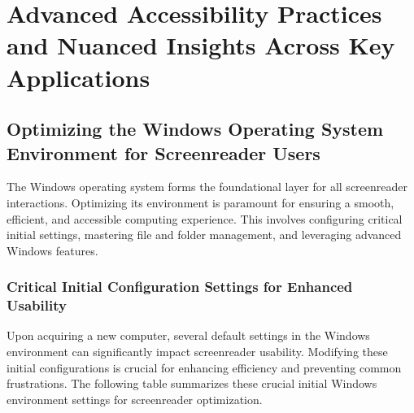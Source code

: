\section{Advanced Accessibility Practices and Nuanced Insights Across Key Applications}

\subsection{Optimizing the Windows Operating System Environment for Screenreader Users}
The Windows operating system forms the foundational layer for all screenreader interactions. Optimizing its environment is paramount for ensuring a smooth, efficient, and accessible computing experience. This involves configuring critical initial settings, mastering file and folder management, and leveraging advanced Windows features.

\subsubsection{Critical Initial Configuration Settings for Enhanced Usability}
Upon acquiring a new computer, several default settings in the Windows environment can significantly impact screenreader usability. Modifying these initial configurations is crucial for enhancing efficiency and preventing common frustrations. The following table summarizes these crucial initial Windows environment settings for screenreader optimization.

